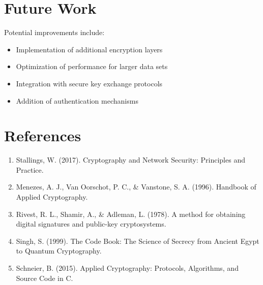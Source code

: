 \documentclass[12pt,a4paper]{article}
\begin{document}
\section{Future Work}
Potential improvements include:

\begin{itemize}
    \item Implementation of additional encryption layers
    \item Optimization of performance for larger data sets
    \item Integration with secure key exchange protocols
    \item Addition of authentication mechanisms
\end{itemize}

\section{References}
\begin{enumerate}
    \item Stallings, W. (2017). Cryptography and Network Security: Principles and Practice.
    \item Menezes, A. J., Van Oorschot, P. C., \& Vanstone, S. A. (1996). Handbook of Applied Cryptography.
    \item Rivest, R. L., Shamir, A., \& Adleman, L. (1978). A method for obtaining digital signatures and public-key cryptosystems.
    \item Singh, S. (1999). The Code Book: The Science of Secrecy from Ancient Egypt to Quantum Cryptography.
    \item Schneier, B. (2015). Applied Cryptography: Protocols, Algorithms, and Source Code in C.
\end{enumerate}
\end{document}
